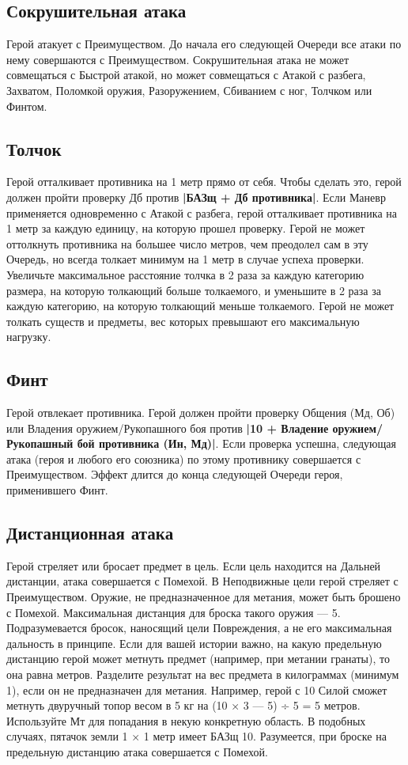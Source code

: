 \subsection{Сокрушительная атака}
Герой атакует с Преимуществом. До начала его следующей Очереди все атаки по нему совершаются с Преимуществом. Сокрушительная атака не может совмещаться с Быстрой атакой, но может совмещаться с Атакой с разбега, Захватом, Поломкой оружия, Разоружением, Сбиванием с ног, Толчком или Финтом.
\subsection{Толчок}
Герой отталкивает противника на 1 метр прямо от себя. Чтобы сделать это, герой должен пройти проверку Дб против \textbf{|БАЗщ + Дб противника|}.
\newline
Если Маневр применяется одновременно с Атакой с разбега, герой отталкивает противника на 1 метр за каждую единицу, на которую прошел проверку. Герой не может оттолкнуть противника на большее число метров, чем преодолел сам в эту Очередь, но всегда толкает минимум на 1 метр в случае успеха проверки.
Увеличьте максимальное расстояние толчка в 2 раза за каждую категорию размера, на которую толкающий больше толкаемого, и уменьшите в 2 раза за каждую категорию, на которую толкающий меньше толкаемого.
\newline
Герой не может толкать существ и предметы, вес которых превышают его максимальную нагрузку.
\subsection{Финт}
Герой отвлекает противника. Герой должен пройти проверку Общения (Мд, Об) или Владения оружием/Рукопашного боя против \textbf{|10 + Владение оружием/Рукопашный бой противника (Ин, Мд)|}. Если проверка успешна, следующая атака (героя и любого его союзника) по этому противнику совершается с Преимуществом. Эффект длится до конца следующей Очереди героя, применившего Финт.
\subsection{Дистанционная атака}
Герой стреляет или бросает предмет в цель. Если цель находится на Дальней дистанции, атака совершается с Помехой. В Неподвижные цели герой стреляет с Преимуществом.
\newline
Оружие, не предназначенное для метания, может быть брошено с Помехой. Максимальная дистанция для броска такого оружия — 5. Подразумевается бросок, наносящий цели Повреждения, а не его максимальная дальность в принципе.
\newline
Если для вашей истории важно, на какую предельную дистанцию герой может метнуть предмет (например, при метании гранаты), то она равна  метров. Разделите результат на вес предмета в килограммах (минимум 1), если он не предназначен для метания. Например, герой с 10 Силой сможет метнуть двуручный топор весом в 5 кг на (10 × 3 — 5) ÷ 5 = 5 метров. Используйте Мт для попадания в некую конкретную область. В подобных случаях, пятачок земли 1 × 1 метр имеет БАЗщ 10. Разумеется, при броске на предельную дистанцию атака совершается с Помехой.
